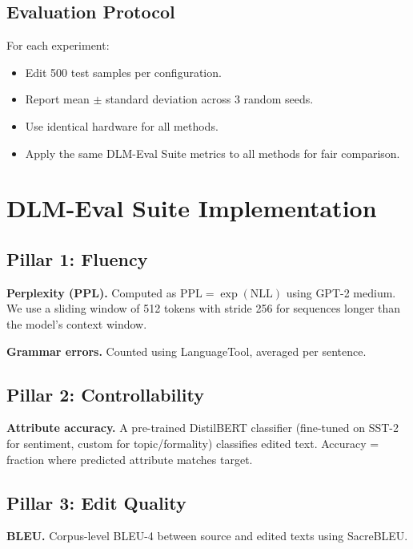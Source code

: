 \documentclass{article}
\begin{document}
\subsection{Evaluation Protocol}

For each experiment:
\begin{itemize}
  \item Edit 500 test samples per configuration.
  \item Report mean $\pm$ standard deviation across 3 random seeds.
  \item Use identical hardware for all methods.
  \item Apply the same DLM-Eval Suite metrics to all methods for fair comparison.
\end{itemize}

\section{DLM-Eval Suite Implementation}
\label{app:eval_suite}

\subsection{Pillar 1: Fluency}

\textbf{Perplexity (PPL).} Computed as $\text{PPL} = \exp(\text{NLL})$ using GPT-2 medium. We use a sliding window of 512 tokens with stride 256 for sequences longer than the model's context window.

\textbf{Grammar errors.} Counted using LanguageTool, averaged per sentence.

\subsection{Pillar 2: Controllability}

\textbf{Attribute accuracy.} A pre-trained DistilBERT classifier (fine-tuned on SST-2 for sentiment, custom for topic/formality) classifies edited text. Accuracy = fraction where predicted attribute matches target.

\subsection{Pillar 3: Edit Quality}

\textbf{BLEU.} Corpus-level BLEU-4 between source and edited texts using SacreBLEU.
\end{document}
